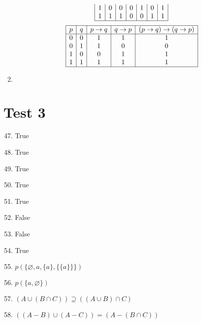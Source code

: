 \documentclass[12pt]{article}
\newcommand{\comment}[1]{}
\newcommand{\enumset}[1]{\setcounter{enumi}{#1}}
\begin{document}
\begin{enumerate}
\begin{tasks}
\[\begin{array}{|*{7}{c|}}
								1 & 0 & 0 & 0 & 1 & 0 & 1 \\
								1 & 1 & 1 & 0 & 0 & 1 & 1 \\\hline
							\end{array}\]
						\task
							\[\begin{array}{|*{5}{c|}}\hline
								p & q & p \to q & q \to p & (p \to q ) \to (q \to p) \\\hline
								0 & 0 & 1 & 1 & 1 \\
								0 & 1 & 1 & 0 & 0 \\
								1 & 0 & 0 & 1 & 1 \\
								1 & 1 & 1 & 1 & 1 \\\hline
							\end{array}\]
					\end{tasks}
					\enumset{34}
					\item
						\begin{tasks}
							\task
									
						\end{tasks}
			\end{enumerate}
	\section*{Test 3}
		\begin{enumerate}
			\enumset{46}
			\item
				True
			\item
				True 
			\item
				True
			\item
				True
			\item
				True
			\item
				False
			\item
				False
			\item
				True
			\enumset{18}
			\item
				\(p(\{\varnothing, a, \{a\}, \{\{a\}\}\})\)
			\enumset{21}
			\item
				\(p(\{a, \varnothing\})\)
			\enumset{15}
			\item
				\((A \cup (B \cap C)) \supseteq ((A \cup B) \cap C)\)
			\item
				\(((A - B) \cup (A - C)) = (A - (B \cap C))\)
			\comment{
				\enumset{12}
				\item
				\enumset{159}
				\item
					\(a_n = 4n + 1\)
				\enumset{162}
				\item
					\(a_n = 1.1 - 0.1n\)
				\enumset{172}
				\item
					\(a_{n} = \dfrac{na_{n - 1}}{n + 1}\), \(a_1 = \dfrac{1}{2}\)
				\item
					\(a_n = a_{n - 1} + 10^{-n}\), \(a_1 = 0.1\)
				\enumset{183}
				\item
					\begin{align*}
						a_{n + 1} &= 2(n + 1) = 2n + 2 = a_n + 2	
					\end{align*}
			}
		\end{enumerate}
\end{document}
